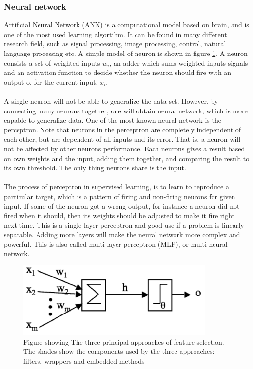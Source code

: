 \documentclass[USenglish]{ifimaster}  %
\begin{document}
\subsubsection{Neural network}
Artificial Neural Network (ANN) is a computational model based on brain, and is one of the most used learning algortihm. It can be found in many different research field, such as signal processing, image processing, control, natural language processing etc. A simple model of neuron is shown in figure \ref{fig:NN}. A neuron consists a set of weighted inputs $w_i$, an adder which sums weighted inputs signals and an activation function to decide whether the neuron should fire with an output o, for the current input, $x_i$. 
\\
\\
A single neuron will not be able to generalize the data set. However, by connecting many neurons together, one will obtain neural network, which is more capable to generalize data. One of the most known neural network is the perceptron. Note that neurons in the perceptron are completely independent of each other, but are dependent of all inputs and its error. That is, a neuron will not be affected by other neurons performance. Each neurons gives a result based on own weights and the input, adding them together, and comparing the result to its own threshold. The only thing neurons share is the input. 
\\
\\
The process of perceptron in supervised learning, is to learn to reproduce a particular target, which is a pattern of firing and non-firing neurons for given input. If some of the neuron got a wrong output, for instance a neuron did not fired when it should, then its weights should be adjusted to make it fire right next time. This is a single layer perceptron and good use if a problem is linearly separable. Adding more layers will make the neural network more complex and powerful. This is also called multi-layer perceptron (MLP), or multi neural network.


\begin{figure}[h]
	\centering
	\includegraphics[scale=0.9]{Figures/neuron.PNG}
	\caption{Figure showing The three principal approaches of feature selection. The shades show the components used by the three approaches: filters, wrappers and embedded methods \cite{Marsland:2009:MLA:1571643}}
	\label{fig:NN}
\end{figure}
\end{document}
